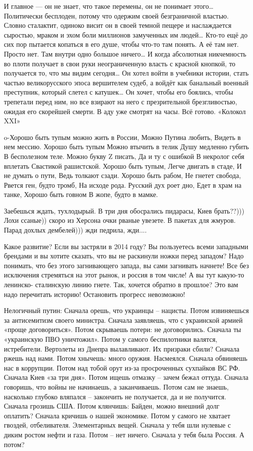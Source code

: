 И главное — он не знает, что такое перемены, он не понимает этого…
Политически бесплоден, потому что одержим своей безграничной властью.
Словно сталактит, одиноко висит он в своей темной пещере и наслаждается сыростью, мраком и эхом боли миллионов замученных им людей…
Кто-то ещё до сих пор пытается копаться в его душе, чтобы что-то там понять.
А её там нет. Просто нет. Там внутри одно большое ничего…
И когда абсолютная никчемность во плоти получает в свои руки неограниченную власть с красной кнопкой, то получается то, что мы видим сегодня…
Он хотел войти в учебники истории, стать частью великорусского эпоса вершителем судеб, а войдёт как банальный военный преступник, который слетел с катушек…
Он хочет, чтобы его боялись, чтобы трепетали перед ним, но все взирают на него с презрительной брезгливостью, ожидая его скорейшей смерти.
В аду уже смотрят на часы. Всё готово.
«Колокол XXI»

o-Хорошо быть тупым
можно жить в России,
Можно Путина любить,
Видеть в нем мессию.
Хорошо быть тупым
Можно втычить в телик
Душу медленно губить
В бесполезном теле.
Можно букву Z писать,
Да и ту с ошибкой
В некролог себя вплетать
Свастикой рашистской.
Хорошо быть тупым,
Легче двигать в стаде,
И не думать о пути,
Ведь толкают сзади.
Хорошо быть рабом,
Не гнетет свобода,
Рвется ген, будто тромб,
На исходе рода.
Русский дух роет дно,
Едет в храм на танке,
Хорошо быть говном
В жопе, будто в мамке.

Заебешься ждать, тухлодырый. В три дня обосрались пидарасы, Киев брать??)))
Лохи ссаные)) скоро из Херсона очки рваные увезете. В пакетах для жмуров. Парад
дохлых дембелей))) жди педрила, жди....

Какое развитие? Если вы застряли в 2014 году? Вы пользуетесь всеми западными
брендами и вы хотите сказать, что вы не раскинули ножки перед западом? Надо
понимать, что без этого загнивающего запада, вы сами загнивать начнете! Все без
исключения стремяться на этот рынок, и россия в том числе! А вы тут какую-то
ленинско- сталинскую линию гнете. Так, хочется обратно в прошлое? Это вам надо
перечитать историю! Остановить прогресс невозможно!

Нелогичный путин:
Сначала орешь, что украинцы – нацисты. Потом извиняешься за антисемитизм своего министра.
Сначала заявляешь, что с украинской армией «проще договориться». Потом скрываешь потери: не договорились.
Сначала ты «украинскую ПВО уничтожил». Потом у самого беспилотники валятся, истребители. Вертолеты из Днепра вылавливают. Их призраки сбили?
Сначала ржешь над нами. Потом хнычешь: много оружия. Насмеялся.
Сначала обвиняешь нас в коррупции. Потом над тобой орут из-за просроченных сухпайков ВС РФ.
Сначала Киев «за три дня». Потом ищешь отмазку – зачем бежал оттуда.
Сначала говоришь, что войны не начинаешь, а заканчиваешь. Потом сам не знаешь, насколько глубоко вляпался – закончить не получается, да и не получится.
Сначала грозишь США. Потом клянчишь: Байден, можно внешний долг оплатить?
Сначала кричишь о нашей экономике. Потом у самого не хватает гвоздей, отбеливателя. Элементарных вещей.
Сначала у тебя шли нулевые с диким ростом нефти и газа. Потом – нет ничего.
Сначала у тебя была Россия. А потом?


